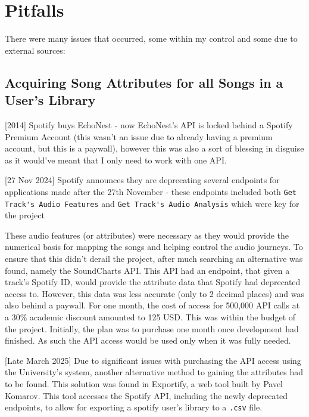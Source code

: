 \section{Pitfalls}
There were many issues that occurred, some within my control and some due to external sources:

\subsection{Acquiring Song Attributes for all Songs in a User's Library}
[2014] Spotify buys EchoNest - now EchoNest's API is locked behind a Spotify Premium Account (this wasn't an issue due to already having a premium account, but this is a paywall), however this was also a sort of blessing in disguise as it would've meant that I only need to work with one API.
    
[27 Nov 2024] Spotify announces they are deprecating several endpoints for applications made after the 27th November - these endpoints included both \lstinline|Get Track's Audio Features| and \lstinline|Get Track's Audio Analysis| which were key for the project

These audio features (or attributes) were necessary as they would provide the numerical basis for mapping the songs and helping control the audio journeys.
To ensure that this didn't derail the project, after much searching an alternative was found, namely the SoundCharts API. This API had an endpoint, that given a track's Spotify ID, would provide the attribute data that Spotify had deprecated access to.
However, this data was less accurate (only to 2 decimal places) and was also behind a paywall. For one month, the cost of access for 500,000 API calls at a 30\% academic discount amounted to 125 USD. This was within the budget of the project. Initially, the plan was to purchase one month once development had finished. As such the API access would be used only when it was fully needed.

[Late March 2025] Due to significant issues with purchasing the API access using the University's system, another alternative method to gaining the attributes had to be found. This solution was found in Exportify, a web tool built by Pavel Komarov. This tool accesses the Spotify API, including the newly deprecated endpoints, to allow for exporting a spotify user's library to a \lstinline|.csv| file.

